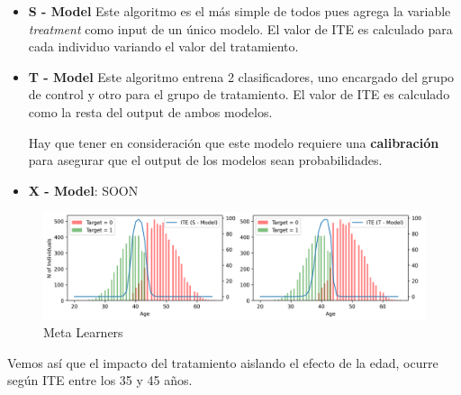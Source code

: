 \begin{itemize}
    \item \textbf{S - Model} Este algoritmo es el más simple de todos pues agrega la variable \textit{treatment} como input de un único modelo. El valor de ITE es calculado para cada individuo variando el valor del tratamiento. 
    \item \textbf{T - Model} Este algoritmo entrena 2 clasificadores, uno encargado del grupo de control y otro para el grupo de tratamiento. El valor de ITE es calculado como la resta del output de ambos modelos. 

    Hay que tener en consideración que este modelo requiere una \textbf{calibración} para asegurar que el output de los modelos sean probabilidades.
    \item \textbf{X - Model}: SOON 
\end{itemize}


\begin{figure}[H]
    \center
    \includegraphics[scale=0.5]{notebooks/STATS/img/causal_inference_meta_learners.png}
    \caption{Meta Learners}
\end{figure}

Vemos así que el impacto del tratamiento aislando el efecto de la edad, ocurre según ITE entre los 35 y 45 años. 





